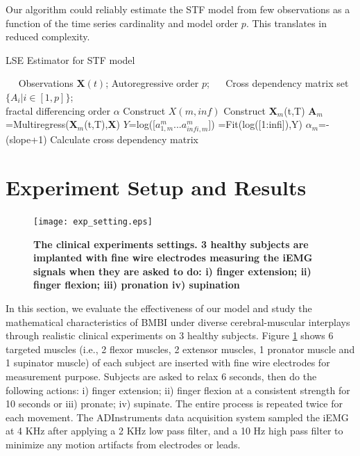 Our algorithm could reliably estimate the STF model from few observations as a function of the time series cardinality and model order $p$. This translates in reduced complexity. 
\begin{algorithm}[t]
\caption{LSE Estimator for STF model}
\label{alg:KL}
\begin{algorithmic}[1]
\REQUIRE ~~ Observations $\textbf{X}(t)$; Autoregressive order $p$;
    \ENSURE ~~ Cross dependency matrix set $\{A_{i}|i\in [1,p]\}$; \\
     fractal differencing order $\alpha$   
\STATE Construct $X(m,inf)$
\STATE Construct \textbf{X}$_{m}$(t,T) 
\STATE \textbf{A}$_{m}$=Multiregress(\textbf{X}$_{m}$(t,T),\textbf{X})
\STATE $Y$=log([$a^{m}_{1,m}$...$a^{m}_{infi,m}$])
=Fit(log([1:infi]),Y)
\STATE $\alpha_{m}$=-(slope+1)
\STATE Calculate cross dependency matrix
\ENDFOR
\end{algorithmic}
\end{algorithm}
\section{Experiment Setup and Results}
\begin{figure}%
\centering
\texttt{[image: exp\_setting.eps]}
\vskip -4mm
\caption{\textbf{The clinical experiments settings. 3 healthy subjects are implanted with fine wire electrodes measuring the iEMG signals when they are asked to do: i) finger extension; ii) finger flexion; iii) pronation iv) supination}}\label{fig:exp_setting}
\end{figure}
 
In this section, we evaluate the effectiveness of our model and study the mathematical characteristics of BMBI under diverse cerebral-muscular interplays through realistic clinical experiments on 3 healthy subjects. Figure \ref{fig:exp_setting} shows 6 targeted muscles (i.e., 2 flexor muscles, 2 extensor muscles, 1 pronator muscle and 1 supinator muscle) of each subject are inserted with fine wire electrodes for measurement purpose. Subjects are asked to relax 6 seconds, then do the following actions: i) finger extension; ii) finger flexion at a consistent strength for 10 seconds or iii) pronate; iv) supinate. The entire process is repeated twice for each movement. The ADInstruments data acquisition system sampled the iEMG at 4 KHz after applying a 2 KHz low pass filter, and a 10 Hz high pass filter to minimize any motion artifacts from electrodes or leads.


